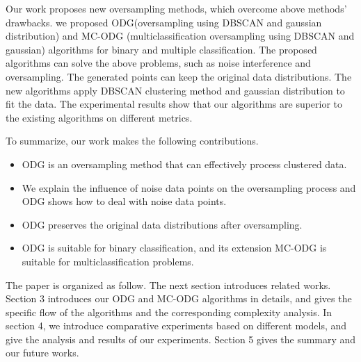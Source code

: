 \documentclass[runningheads]{llncs}
\begin{document}

Our work proposes new oversampling methods, which overcome above methods' drawbacks.
we proposed ODG(oversampling using DBSCAN and gaussian distribution) and MC-ODG
(multiclassification oversampling using DBSCAN and gaussian) algorithms 
for binary and multiple classification.
The proposed algorithms can solve the above problems, such as noise interference and oversampling. 
The generated points can keep the original data distributions.
The new algorithms apply DBSCAN clustering method and gaussian
distribution to fit the data.
The experimental results show that our algorithms are superior 
to the existing algorithms on different metrics.

To summarize, our work makes the following contributions.
\begin{itemize}
  \item ODG is an oversampling method that can effectively process clustered data.
  \item We explain the influence of noise data points on the oversampling process and ODG shows how to deal with noise data points.
  \item ODG preserves the original data distributions after oversampling.
  \item ODG is suitable for binary classification, and its extension MC-ODG is suitable for multiclassification problems.
\end{itemize}

The paper is organized as follow. The next section introduces 
related works. Section 3 introduces our ODG and MC-ODG 
algorithms in details, 
and gives the specific flow of the algorithms and the corresponding complexity analysis.
In section 4, we introduce comparative experiments based on different models, 
and give the analysis and results of our experiments. Section 5 gives the summary and our future works.
\end{document}
